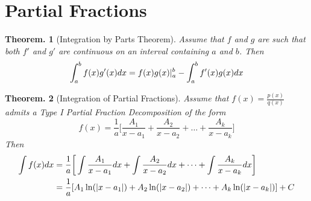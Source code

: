 \documentclass[11pt, a4paper]{memoir}
\theoremstyle{change}
\newtheorem{theorem}{Theorem.}[section]
\theoremstyle{plain}
\theoremstyle{nonumberplain}
\numberwithin{equation}{section}
\begin{document}
\section{Partial Fractions}
\begin{theorem}[Integration by Parts Theorem]
Assume that $f$  and $g$  are such that both $f'$ and $g'$ are continuous on an interval containing $a$ and $b$. Then $$\int^b_a f(x)g'(x) \space dx = f(x)g(x)|^b_a - \int^b_a f'(x)g(x) \space dx$$
\end{theorem}
\begin{theorem}[Integration of Partial Fractions]
    Assume that $f(x) = \frac{p(x)}{q(x)}$ admits a Type I Partial Fraction Decomposition of the form $$f(x) = \dfrac{1}{a}\bigg[\dfrac{A_1}{x - a_1} + \dfrac{A_2}{x - a_2} + \dots + \dfrac{A_k}{x - a_k} \bigg]$$
    Then 
    \begin{align*}
        \int f(x) \space dx &= \dfrac{1}{a}\bigg[\int \dfrac{A_1}{x - a_1} \space dx + \int \dfrac{A_2}{x - a_2} \space dx + \dots + \int \dfrac{A_k}{x - a_k} \space dx \bigg]\\
        &= \dfrac{1}{a}[A_1 \ln (|x - a_1|) + A_2 \ln (|x - a_2|) + \dots + A_k \ln (|x - a_k|)] + C
    \end{align*}
\end{theorem}
\end{document}
